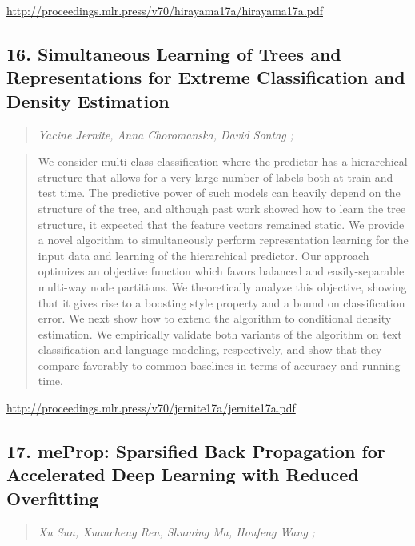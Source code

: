 \documentclass{article}
\begin{document}
\href{http://proceedings.mlr.press/v70/hirayama17a/hirayama17a.pdf}{http://proceedings.mlr.press/v70/hirayama17a/hirayama17a.pdf}

\subsection{16. Simultaneous Learning of Trees and Representations for Extreme Classification and Density Estimation}

\begin{quote}
\footnotesize{\textit{Yacine Jernite, Anna Choromanska, David Sontag ;}}
\end{quote}

\begin{quote}
    We consider multi-class classification where the predictor has a hierarchical structure that allows for a very large number of labels both at train and test time. The predictive power of such models can heavily depend on the structure of the tree, and although past work showed how to learn the tree structure, it expected that the feature vectors remained static. We provide a novel algorithm to simultaneously perform representation learning for the input data and learning of the hierarchical predictor. Our approach optimizes an objective function which favors balanced and easily-separable multi-way node partitions. We theoretically analyze this objective, showing that it gives rise to a boosting style property and a bound on classification error. We next show how to extend the algorithm to conditional density estimation. We empirically validate both variants of the algorithm on text classification and language modeling, respectively, and show that they compare favorably to common baselines in terms of accuracy and running time.  \end{quote}

\href{http://proceedings.mlr.press/v70/jernite17a/jernite17a.pdf}{http://proceedings.mlr.press/v70/jernite17a/jernite17a.pdf}

\subsection{17. meProp: Sparsified Back Propagation for Accelerated Deep Learning with Reduced Overfitting}

\begin{quote}
\footnotesize{\textit{Xu Sun, Xuancheng Ren, Shuming Ma, Houfeng Wang ;}}
\end{quote}
\end{document}
